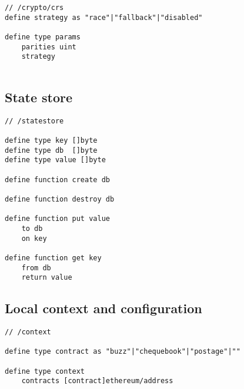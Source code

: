 \begin{definition}\label{def:crs-params}
\begin{lstlisting}[language=buzz1]
// /crypto/crs
define strategy as "race"|"fallback"|"disabled"

define type params 
    parities uint
    strategy 
     
\end{lstlisting}
\end{definition}


\subsection{State store \statusgreen}\label{spec:format:statestore}
% 

\begin{definition}\label{def:state-store}
\begin{lstlisting}[language=buzz1]
// /statestore

define type key []byte
define type db  []byte
define type value []byte

define function create db

define function destroy db

define function put value
    to db
    on key
    
define function get key 
    from db
    return value
\end{lstlisting}
\end{definition}


\subsection{Local context and configuration \statusgreen}\label{spec:format:local}
% 


\begin{definition}[Context]\label{def:scontext}
\begin{lstlisting}[language=buzz1]
// /context

define type contract as "buzz"|"chequebook"|"postage"|""

define type context
    contracts [contract]ethereum/address 
\end{lstlisting}
\end{definition}